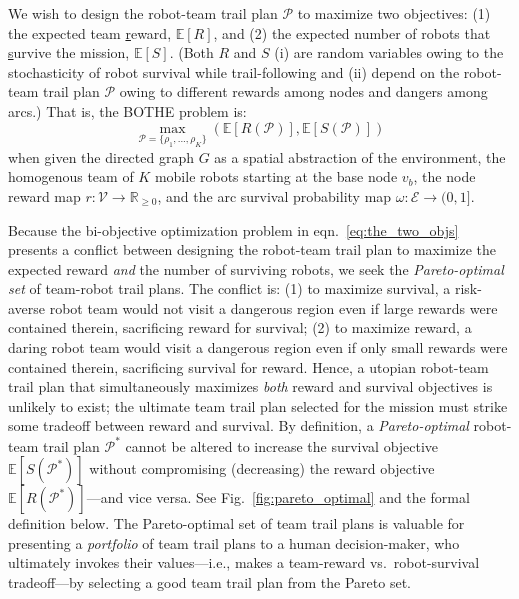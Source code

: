\documentclass[fleqn,10pt,lineno]{wlpeerj}
\begin{document}
We wish to design the robot-team trail plan $\mathcal{P}$ to maximize two objectives: 
(1) the expected team \underline{r}eward, $\mathbb{E}[R]$, and (2) the expected number of robots that \underline{s}urvive the mission, $\mathbb{E}[S]$. (Both $R$ and $S$ (i) are random variables owing to the stochasticity of robot survival while trail-following and (ii) depend on the robot-team trail plan $\mathcal{P}$ owing to different rewards among nodes and dangers among arcs.) 
That is, the BOTHE problem is:
\begin{equation}
	\max_{\mathcal{P}=\{\rho_1, ..., \rho_K\}} \left( \mathbb{E}[R(\mathcal{P})], \mathbb{E}[S(\mathcal{P})] \right)
	\label{eq:the_two_objs}
\end{equation}
when given the directed graph $G$ as a spatial abstraction of the environment, 
the homogenous team of $K$ mobile robots starting at the base node $v_b$,
the node reward map $r: \mathcal{V} \rightarrow \mathbb{R}_{\geq 0}$, and the arc survival probability map $\omega : \mathcal{E} \rightarrow (0, 1]$.

Because the bi-objective optimization problem in eqn.~\ref{eq:the_two_objs} presents a conflict between designing the robot-team trail plan to maximize the expected reward \emph{and} the number of surviving robots, we seek the \emph{Pareto-optimal set} \cite{pardalos2017non,branke2008multiobjective} of team-robot trail plans. 
The conflict is: 
(1) to maximize survival, a risk-averse robot team would not visit a dangerous region even if large rewards were contained therein, sacrificing reward for survival; 
(2) to maximize reward, a daring robot team would visit a dangerous region even if only small rewards were contained therein, sacrificing survival for reward. 
Hence, a utopian robot-team trail plan that simultaneously maximizes \emph{both} reward and survival objectives is unlikely to exist; the ultimate team trail plan selected for the mission must strike some tradeoff between reward and survival.
By definition, a \emph{Pareto-optimal} \cite{pardalos2017non,branke2008multiobjective} robot-team trail plan $\mathcal{P}^*$ cannot be altered to increase the survival objective $\mathbb{E}[S(\mathcal{P}^*)]$ without compromising (decreasing) the reward objective $\mathbb{E}[R(\mathcal{P}^*)]$---and vice versa. See Fig.~\ref{fig:pareto_optimal} and the formal definition below.
The Pareto-optimal set of team trail plans is valuable for presenting a \emph{portfolio} of team trail plans to a human decision-maker, who ultimately invokes their values---i.e., makes a team-reward vs.\  robot-survival tradeoff---by selecting a good team trail plan from the Pareto set.
\end{document}
